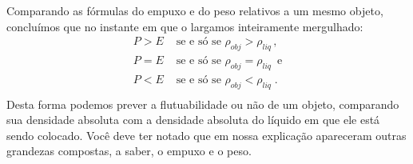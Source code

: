 Comparando as fórmulas do empuxo e do peso relativos a um mesmo objeto, concluímos que no instante em que o largamos inteiramente mergulhado:
\begin{equation*}
\begin{split}P > E & \,\, \text{se e só se} \,\, \rho_{obj} > \rho_{liq} \, \text{,} \\
P = E & \,\, \text{se e só se}  \,\, \rho_{obj} = \rho_{liq} \,\,\, \text{e} \\
P < E & \,\, \text{se e só se} \,\, \rho_{obj} < \rho_{liq} \;\text{.}\\\end{split}
\end{equation*}
Desta forma podemos prever a flutuabilidade ou não de um objeto, comparando sua densidade absoluta com a densidade absoluta do líquido em que ele está sendo colocado. Você deve ter notado que em nossa explicação apareceram outras grandezas compostas, a saber, o empuxo e o peso.


